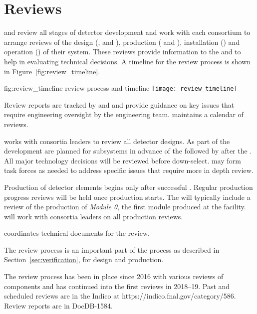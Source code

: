 \chapter{Reviews}
\label{vl:tc-review}

 and  review all stages of detector development
and work with each consortium to arrange reviews of the design
(,  and ), production (
and ), installation () and operation
() of their system.  These reviews provide information to
the  and  to help in evaluating technical
decisions. A timeline for the review process is shown in
Figure~\ref{fig:review_timeline}.
\begin{dunefigure}{fig:review_timeline}
  { review process and timeline}
  \texttt{[image: review\_timeline]}
\end{dunefigure}
Review reports are tracked by  and  and provide
guidance on key issues that require engineering oversight by the
 engineering team.  maintains a calendar of
 reviews.

 works with consortia leaders to review all detector
designs.  As part of the  development  are
planned for subsystems in advance of the  followed by
 after the .  All major technology decisions
will be reviewed before down-select.   may form task forces
as needed to address specific issues that require more in depth
review.


Production of detector elements begins only after successful
. Regular production progress reviews will be held once
production starts. The  will typically include a review of
the production of \textit{Module 0}, the first module produced at the
facility.  will work with consortia leaders on all
production reviews.

 coordinates technical documents for the 
 review.

The review process is an important part of the  
process as described in Section~\ref{sec:verification}, for
design and production.

The review process has been in place since 2016 with various reviews
of  components and has continued into the first
 reviews in 2018--19. Past and scheduled reviews are in
the  Indico at https://indico.fnal.gov/category/586.
Review reports are in DocDB-1584.

